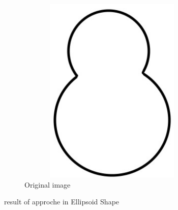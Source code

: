 \begin{figure}[H]
    \centering
    \begin{subfigure}[b]{1\textwidth}
        \centering
        \includegraphics[width=12cm,height=9cm]{chapiter3/figures/figure 13 a.jpg}
        \caption{Original image}
    \end{subfigure}
    \caption{result of approche in Ellipsoid Shape}
    \label{fig:figure3.12}
\end{figure}
